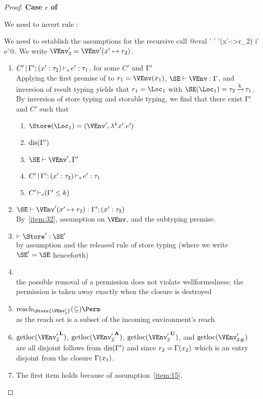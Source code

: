 \begin{proof}
  \newpage{}
  \textbf{Case $e$ of}

  We need to invert rule :
  \begin{mathpar}
  \end{mathpar}

  We need to establish the assumptions for the recursive call
  @eval \Store' \Perm' \VEnv'(x'-:>r_2) i' e'@.
  We write $\VEnv_2' = \VEnv' (x'\mapsto r_2)$.
  \begin{enumerate}[({A1-}1)]
  \item $\inferS{C'}{\E'; \bvar{x'}{\tau_2}}{e'}{\tau_1}$, for some
    $C'$ and $\E'$\\
    Applying the first premise of  to $r_1 = \VEnv
    (x_1)$, $\SE \vdash \VEnv : \E$, and inversion of result typing
    yields that $r_1 = \Loc_1$ with $\SE (\Loc_1) = \tau_2 \tarr{k}
    \tau_1$.
    By inversion of store typing and storable typing, we find that
    there exist $\E'$ and $C'$ such that
    \begin{enumerate}
    \item $\Store (\Loc_1) = (\VEnv', \lam[k]{x'}{e'})$
    \item $\Disjoint{\E'}$
    \item\label{item:32} $\SE \vdash \VEnv', \E'$
    \item $\inferS{C'}{\E';\bvar {x'}{\tau_2}}{e'}{\tau_1}$
    \item $\addlin{\entail{C'}{\Cleq{\E'}{k}}}$
    \end{enumerate}
  \item $\SE \vdash \VEnv' (x' \mapsto r_2) : \E';
    \bvar{x'}{\tau_2}$\\
    By~\ref{item:32}, assumption on $\VEnv$, and the subtyping premise.
  \item $\vdash \Store' : \SE'$ \\
    by assumption and the released rule of store typing (where we
    write $\SE'=\SE$ henceforth)
  \item {} \\
    the possible removal of a permission does not violate
    wellformedness; the permission is taken away exactly when the
    closure is destroyed
  \item $\Reach\Store{\VEnv_2'} \subseteq \Perm$\\
    as the reach set is a subset of the incoming environment's reach
  \item $\Rawloc{\Active{\VEnv_2'}}$,
    $\Rawloc{\MutableBorrows{\VEnv_2'}}$,
    $\Rawloc{\ImmutableBorrows{\VEnv_2'}}$, and
    $\Rawloc{\Suspended{\VEnv_2'}}$ are all disjoint follows from
    $\Disjoint{\E'}$ and since $r_2= \E (x_2)$ which is an entry
    disjoint from the closure $\E(x_1)$.
  \item {}
    The first item holds because of assumption~\ref{item:15}.


\end{enumerate}
\end{proof}
